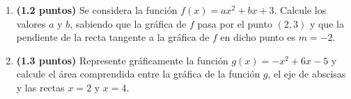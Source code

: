 
\begin{enumerate}[label=\alph*)]
  \item \textbf{(1.2 puntos)} Se considera la función $f(x)=ax^2+bx+3$.
  Calcule los valores $a$ y $b$, sabiendo que la gráfica de $f$ pasa por el
  punto $(2,3)$ y que la pendiente de la recta tangente a la gráfica de $f$
  en dicho punto es $m=-2$.
  \item \textbf{(1.3 puntos)} Represente gráficamente la función
  $g(x)=-x^2+6x-5$ y calcule el área comprendida entre la gráfica de la
  función $g$, el eje de abscisas y las rectas $x=2$ y $x=4$.
\end{enumerate}
